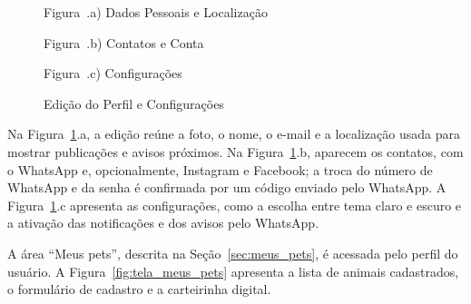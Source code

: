 \begin{figure}[H]
    \centering
    \caption{Edição do Perfil e Configurações}
    \label{fig:tela_editar_perfil_config}
    \vspace{0.15cm}
    \begin{minipage}[t]{0.31\textwidth}
        \centering
        \par\vspace{0.12cm}
        {\small Figura~\thefigure.a) Dados Pessoais e Localização}
    \end{minipage}
    \hfill
    \begin{minipage}[t]{0.31\textwidth}
        \centering
        \par\vspace{0.12cm}
        {\small Figura~\thefigure.b) Contatos e Conta}
    \end{minipage}
    \hfill
    \begin{minipage}[t]{0.31\textwidth}
        \centering
        \par\vspace{0.12cm}
        {\small Figura~\thefigure.c) Configurações}
    \end{minipage}
    \par\vspace{0.12cm}
\end{figure}

Na Figura~\ref{fig:tela_editar_perfil_config}.a, a edição reúne a foto, o nome, o e-mail e a localização usada para mostrar publicações e avisos próximos. Na Figura~\ref{fig:tela_editar_perfil_config}.b, aparecem os contatos, com o WhatsApp e, opcionalmente, Instagram e Facebook; a troca do número de WhatsApp e da senha é confirmada por um código enviado pelo WhatsApp. A Figura~\ref{fig:tela_editar_perfil_config}.c apresenta as configurações, como a escolha entre tema claro e escuro e a ativação das notificações e dos avisos pelo WhatsApp.

A área ``Meus pets'', descrita na Seção~\ref{sec:meus_pets}, é acessada pelo perfil do usuário. A Figura~\ref{fig:tela_meus_pets} apresenta a lista de animais cadastrados, o formulário de cadastro e a carteirinha digital.

